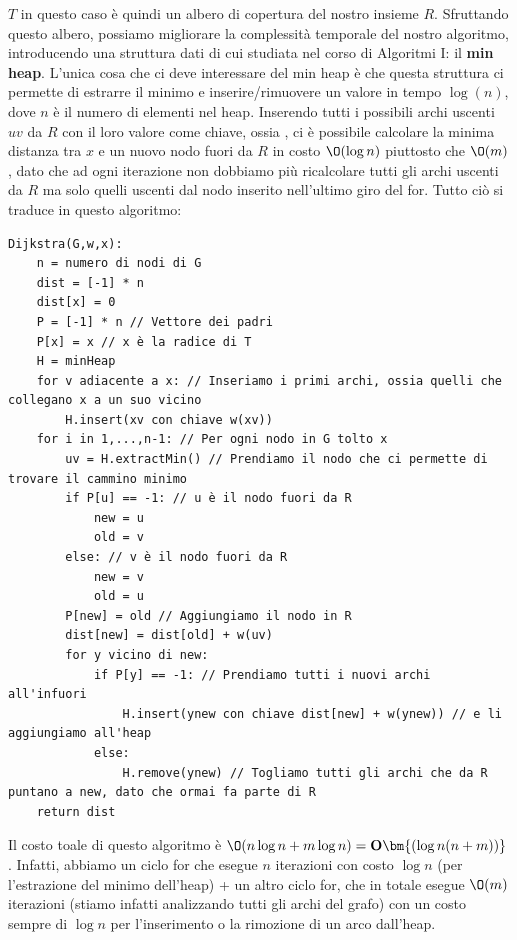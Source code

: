 \documentclass[11pt, a4paper, titlepage, oneside]{scrbook}
\begin{document}
$T$ in questo caso è quindi un albero di copertura del nostro insieme $R$. Sfruttando questo albero, possiamo migliorare la complessità temporale del nostro algoritmo, introducendo una struttura dati di cui studiata nel corso di Algoritmi I: il \textbf{min heap}. L'unica cosa che ci deve interessare del min heap è che questa struttura ci permette di estrarre il minimo e inserire/rimuovere un valore in tempo $\log(n)$, dove $n$ è il numero di elementi nel heap. Inserendo tutti i possibili archi uscenti $uv$ da $R$ con il loro valore come chiave, ossia , ci è possibile calcolare la minima distanza tra $x$ e un nuovo nodo fuori da $R$ in costo $\O(\log n)$ piuttosto che $\O(m)$, dato che ad ogni iterazione non dobbiamo più ricalcolare tutti gli archi uscenti da $R$ ma solo quelli uscenti dal nodo inserito nell'ultimo giro del for. Tutto ciò si traduce in questo algoritmo:

\begin{lstlisting}
Dijkstra(G,w,x):
    n = numero di nodi di G
    dist = [-1] * n
    dist[x] = 0
    P = [-1] * n // Vettore dei padri
    P[x] = x // x è la radice di T
    H = minHeap
    for v adiacente a x: // Inseriamo i primi archi, ossia quelli che collegano x a un suo vicino
        H.insert(xv con chiave w(xv)) 
    for i in 1,...,n-1: // Per ogni nodo in G tolto x
        uv = H.extractMin() // Prendiamo il nodo che ci permette di trovare il cammino minimo
        if P[u] == -1: // u è il nodo fuori da R
            new = u
            old = v
        else: // v è il nodo fuori da R
            new = v
            old = u
        P[new] = old // Aggiungiamo il nodo in R
        dist[new] = dist[old] + w(uv)
        for y vicino di new:
            if P[y] == -1: // Prendiamo tutti i nuovi archi all'infuori
                H.insert(ynew con chiave dist[new] + w(ynew)) // e li aggiungiamo all'heap
            else:
                H.remove(ynew) // Togliamo tutti gli archi che da R puntano a new, dato che ormai fa parte di R
    return dist
\end{lstlisting}

Il costo toale di questo algoritmo è $\O(n \log n + m \log n) = \textbf{O}\bm{(\log n(n+m))}$. Infatti, abbiamo un ciclo for che esegue $n$ iterazioni con costo $\log n$ (per l'estrazione del minimo dell'heap) + un altro ciclo for, che in totale esegue $\O(m)$ iterazioni (stiamo infatti analizzando tutti gli archi del grafo) con un costo sempre di $\log n$ per l'inserimento o la rimozione di un arco dall'heap.
\end{document}
